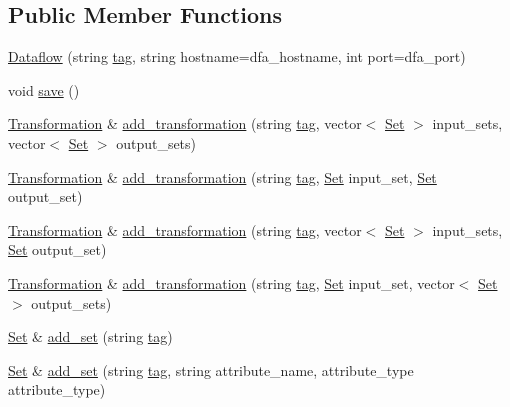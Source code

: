 \subsection*{Public Member Functions}
\begin{DoxyCompactItemize}
\item 
\hyperlink{classDataflow_afebeeacfc0c5fdee45155ebb76dc62c8}{Dataflow} (string \hyperlink{classDataflow_a45d9ba19359e42a9a8d1fa089c994b17}{tag}, string hostname=dfa\+\_\+hostname, int port=dfa\+\_\+port)
\item 
void \hyperlink{classDataflow_a91f7c9eaf26223ff4c1da5f34fedb7be}{save} ()
\item 
\hyperlink{classTransformation}{Transformation} \& \hyperlink{classDataflow_ad0ad633cf3e23c76847e75ae388d29ea}{add\+\_\+transformation} (string \hyperlink{classDataflow_a45d9ba19359e42a9a8d1fa089c994b17}{tag}, vector$<$ \hyperlink{classSet}{Set} $>$ input\+\_\+sets, vector$<$ \hyperlink{classSet}{Set} $>$ output\+\_\+sets)
\item 
\hyperlink{classTransformation}{Transformation} \& \hyperlink{classDataflow_aad2e47f28cfdef9db53520328b88537a}{add\+\_\+transformation} (string \hyperlink{classDataflow_a45d9ba19359e42a9a8d1fa089c994b17}{tag}, \hyperlink{classSet}{Set} input\+\_\+set, \hyperlink{classSet}{Set} output\+\_\+set)
\item 
\hyperlink{classTransformation}{Transformation} \& \hyperlink{classDataflow_a36fad179e5f47f9a9ba1a598650c9b59}{add\+\_\+transformation} (string \hyperlink{classDataflow_a45d9ba19359e42a9a8d1fa089c994b17}{tag}, vector$<$ \hyperlink{classSet}{Set} $>$ input\+\_\+sets, \hyperlink{classSet}{Set} output\+\_\+set)
\item 
\hyperlink{classTransformation}{Transformation} \& \hyperlink{classDataflow_a777634e410ccfe677bf326858efd406f}{add\+\_\+transformation} (string \hyperlink{classDataflow_a45d9ba19359e42a9a8d1fa089c994b17}{tag}, \hyperlink{classSet}{Set} input\+\_\+set, vector$<$ \hyperlink{classSet}{Set} $>$ output\+\_\+sets)
\item 
\hyperlink{classSet}{Set} \& \hyperlink{classDataflow_a1b30ee20329211e193b90e8f8f78242f}{add\+\_\+set} (string \hyperlink{classDataflow_a45d9ba19359e42a9a8d1fa089c994b17}{tag})
\item 
\hyperlink{classSet}{Set} \& \hyperlink{classDataflow_abae00eba6d2eda469cba2391bd293915}{add\+\_\+set} (string \hyperlink{classDataflow_a45d9ba19359e42a9a8d1fa089c994b17}{tag}, string attribute\+\_\+name, attribute\+\_\+type attribute\+\_\+type)
\item 

\end{DoxyCompactItemize}
